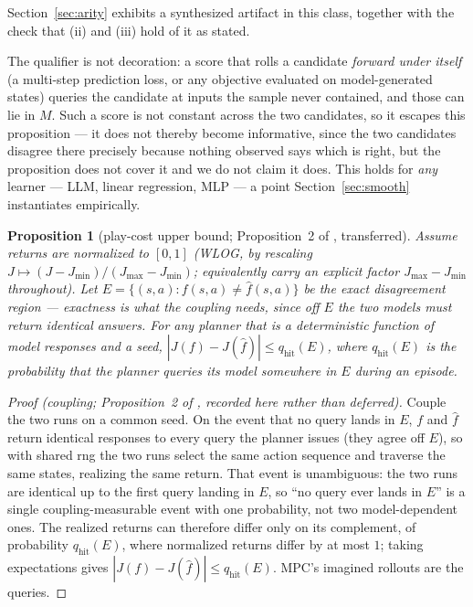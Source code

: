 \documentclass[11pt]{article}
\newtheorem{proposition}{Proposition}
\theoremstyle{definition}
\theoremstyle{remark}
\begin{document}
Section~\ref{sec:arity} exhibits a synthesized artifact in this class, together with the check that (ii) and (iii) hold of it as stated.

The qualifier is not decoration: a score that rolls a candidate \emph{forward under itself} (a multi-step prediction loss, or any objective evaluated on model-generated states) queries the candidate at inputs the sample never contained, and those can lie in $M$. Such a score is not constant across the two candidates, so it escapes this proposition --- it does not thereby become informative, since the two candidates disagree there precisely because nothing observed says which is right, but the proposition does not cover it and we do not claim it does. This holds for \emph{any} learner --- LLM, linear regression, MLP --- a point Section~\ref{sec:smooth} instantiates empirically.


\begin{proposition}[play-cost upper bound; Proposition~2 of \citealp{aguilar2026verified}, transferred]
\label{prop:playcost}
Assume returns are normalized to $[0,1]$ (WLOG, by rescaling $J \mapsto (J - J_{\min})/(J_{\max} - J_{\min})$; equivalently carry an explicit factor $J_{\max} - J_{\min}$ throughout). Let $E = \{(s,a) : f(s,a) \neq \hat f(s,a)\}$ be the \emph{exact} disagreement region --- exactness is what the coupling needs, since off $E$ the two models must return \emph{identical} answers. For any planner that is a deterministic function of model responses and a seed, $|J(f) - J(\hat f)| \leq q_{\mathrm{hit}}(E)$, where $q_{\mathrm{hit}}(E)$ is the probability that the planner queries its model somewhere in $E$ during an episode.
\end{proposition}

\begin{proof}[Proof (coupling; Proposition~2 of \citealp{aguilar2026verified}, recorded here rather than deferred)]
Couple the two runs on a common seed. On the event that no query lands in $E$, $f$ and $\hat f$ return identical responses to every query the planner issues (they agree off $E$), so with shared rng the two runs select the same action sequence and traverse the same states, realizing the same return. That event is unambiguous: the two runs are identical up to the first query landing in $E$, so ``no query ever lands in $E$'' is a single coupling-measurable event with one probability, not two model-dependent ones. The realized returns can therefore differ only on its complement, of probability $q_{\mathrm{hit}}(E)$, where normalized returns differ by at most $1$; taking expectations gives $|J(f) - J(\hat f)| \leq q_{\mathrm{hit}}(E)$. MPC's imagined rollouts are the queries.
\end{proof}
\end{document}
